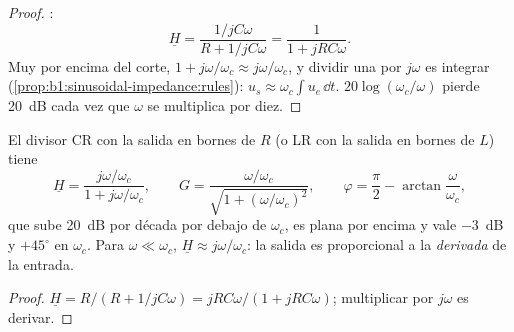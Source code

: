 \begin{proof}
:
\[
\underline H = \frac{1/jC\omega}{R + 1/jC\omega} = \frac{1}{1 + jRC\omega} .
\]
Muy por encima del corte, $1 + j\omega/\omega_c \approx j\omega/\omega_c$,
y dividir una  por $j\omega$ es integrar
(\cref{prop:b1:sinusoidal-impedance:rules}): $u_s \approx \omega_c\int u_e\,\dd t$.
$20\log(\omega_c/\omega)$ pierde \qty{20}{dB} cada vez que $\omega$ se multiplica por diez.
\end{proof}

\begin{proposition}\label{prop:b1:filters-transfer-functions:highpass1}
El divisor CR con la salida en bornes de $R$ (o LR con la salida en
bornes de $L$) tiene
\[
\underline H = \frac{j\omega/\omega_c}{1 + j\omega/\omega_c},
\qquad G = \frac{\omega/\omega_c}{\sqrt{1 + (\omega/\omega_c)^2}},
\qquad \varphi = \frac{\pi}{2} - \arctan\frac{\omega}{\omega_c},
\]
que sube \qty{20}{dB} por década por debajo de $\omega_c$, es plana por
encima y vale \qty{-3}{dB} y $+45^\circ$ en $\omega_c$. Para
$\omega \ll \omega_c$, $\underline H
\approx j\omega/\omega_c$: la salida es proporcional a la
\emph{derivada} de la entrada.
\end{proposition}

\begin{proof}
$\underline H = R/(R + 1/jC\omega) = jRC\omega/(1 + jRC\omega)$;
multiplicar por $j\omega$ es derivar.
\end{proof}

